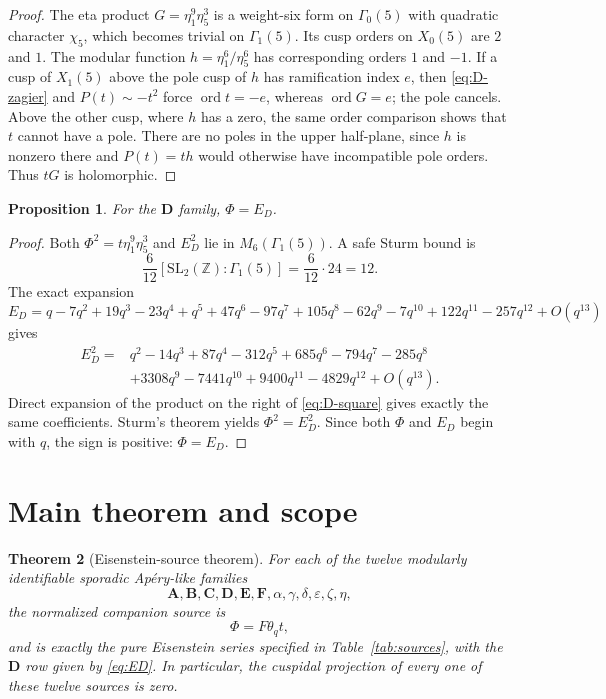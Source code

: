 \documentclass[11pt]{article}
\newtheorem{theorem}{Theorem}[section]
\newtheorem{proposition}[theorem]{Proposition}
\theoremstyle{remark}
\newcommand{\Z}{\mathbb Z}
\newcommand{\thq}{\theta_q}
\begin{document}
\begin{proof}
The eta product $G=\eta_1^9\eta_5^3$ is a weight-six form on
$\Gamma_0(5)$ with quadratic character $\chi_5$, which becomes trivial on
$\Gamma_1(5)$.  Its cusp orders on $X_0(5)$ are $2$ and $1$.
The modular function $h=\eta_1^6/\eta_5^6$ has corresponding orders $1$ and
$-1$.  If a cusp of $X_1(5)$ above the pole cusp of $h$ has ramification
index $e$, then \eqref{eq:D-zagier} and $P(t)\sim-t^2$ force
$\operatorname{ord}t=-e$, whereas $\operatorname{ord}G=e$; the pole cancels.
Above the other cusp, where $h$ has a zero, the same order comparison shows
that $t$ cannot have a pole.  There are no poles in the upper half-plane,
since $h$ is nonzero there and $P(t)=th$ would otherwise have incompatible
pole orders.  Thus $tG$ is holomorphic.
\end{proof}

\begin{proposition}\label{prop:D-source}
For the $\mathbf D$ family, $\Phi=E_D$.
\end{proposition}

\begin{proof}
Both $\Phi^2=t\eta_1^9\eta_5^3$ and $E_D^2$ lie in
$M_6(\Gamma_1(5))$.  A safe Sturm bound is
\[
 \frac6{12}[\mathrm{SL}_2(\Z):\Gamma_1(5)]
 =\frac6{12}\cdot24=12.
\]
The exact expansion
\[
E_D=q-7q^2+19q^3-23q^4+q^5+47q^6-97q^7+105q^8
     -62q^9-7q^{10}+122q^{11}-257q^{12}+O(q^{13})
\]
gives
\begin{align*}
E_D^2={}&q^2-14q^3+87q^4-312q^5+685q^6-794q^7-285q^8\\
&+3308q^9-7441q^{10}+9400q^{11}-4829q^{12}+O(q^{13}).
\end{align*}
Direct expansion of the product on the right of \eqref{eq:D-square} gives
exactly the same coefficients.  Sturm's theorem yields
$\Phi^2=E_D^2$.  Since both $\Phi$ and $E_D$ begin with $q$, the sign is
positive: $\Phi=E_D$.
\end{proof}

\section{Main theorem and scope}

\begin{theorem}[Eisenstein-source theorem]\label{thm:main}
For each of the twelve modularly identifiable sporadic Ap\'ery-like families
\[
 \mathbf A,\mathbf B,\mathbf C,\mathbf D,\mathbf E,\mathbf F,
 \alpha,\gamma,\delta,\varepsilon,\zeta,\eta,
\]
the normalized companion source is
\[
 \Phi=F\thq t,
\]
and is exactly the pure Eisenstein series specified in
Table~\ref{tab:sources}, with the $\mathbf D$ row given by
\eqref{eq:ED}.  In particular, the cuspidal projection of every one of these
twelve sources is zero.
\end{theorem}
\end{document}
